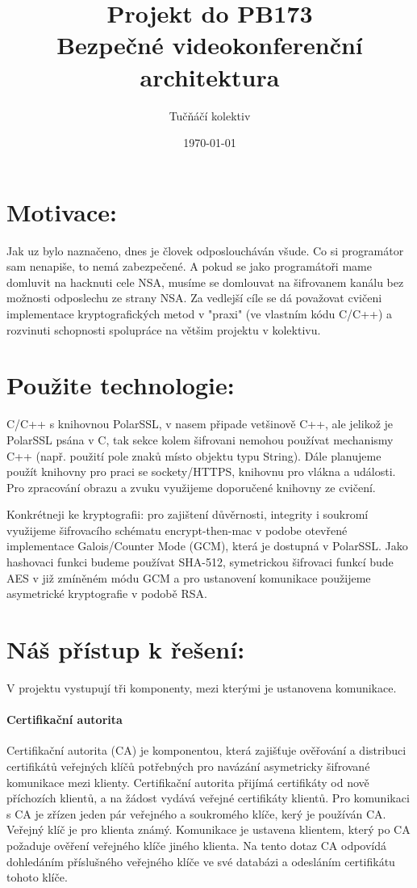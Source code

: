 \documentclass[a4paper, 12pt, titlepage]{article}
\title{Projekt do PB173 \\ Bezpečné videokonferenční architektura}
\author{Tučňáčí kolektiv}
\date{\today}
\begin{document}
\maketitle
\newpage
\tableofcontents
\newpage

\section{Motivace:}

Jak uz bylo naznačeno, dnes je človek odposloucháván všude. Co si programátor 
sam nenapiše, to nemá zabezpečené. A pokud se jako programátoři mame domluvit na 
hacknuti cele NSA,
musíme se domlouvat na šifrovanem kanálu bez možnosti odposlechu ze strany NSA.
Za vedlejší cíle se dá považovat cvičeni implementace kryptografických metod v 
"praxi" (ve vlastním kódu C/C++) a rozvinuti schopnosti spolupráce na většim 
projektu v kolektivu.

\section{Použite technologie:}
C/C++ s knihovnou PolarSSL, v nasem připade vetšinově C++, ale jelikož je 
PolarSSL psána v C, tak sekce kolem šifrovani nemohou používat mechanismy C++ 
(např. použití pole znaků místo objektu typu String).
Dále planujeme použít knihovny pro praci se sockety/HTTPS, knihovnu pro vlákna a 
události. Pro zpracování obrazu a zvuku využijeme doporučené knihovny ze 
cvičení.

Konkrétneji ke kryptografii: pro zajištení důvěrnosti, integrity i soukromí 
využijeme šifrovacího schématu encrypt-then-mac v podobe otevřené implementace 
Galois/Counter Mode (GCM),
která je dostupná v PolarSSL. Jako hashovaci funkci budeme používat SHA-512, 
symetrickou šifrovaci funkcí bude AES v již zmíněném módu GCM a pro ustanovení 
komunikace použijeme asymetrické
kryptografie v podobě RSA.

\section{Náš přístup k řešení:}

V projektu vystupují tři komponenty, mezi kterými je ustanovena komunikace.

\paragraph{Certifikační autorita}
Certifikační autorita (CA) je komponentou, která zajišťuje ověřování a 
distribuci certifikátů veřejných klíčů
potřebných pro navázání asymetricky šifrované komunikace mezi klienty. 
Certifikační autorita přijímá certifikáty od nově příchozích klientů, a na 
žádost vydává veřejné certifikáty klientů. Pro komunikaci s CA je zřízen jeden 
pár veřejného a  soukromého klíče, kerý je používán CA. Veřejný klíč je pro 
klienta známý. Komunikace je ustavena klientem, který po CA požaduje ověření 
veřejného klíče jiného klienta. Na tento dotaz CA odpovídá dohledáním 
příslušného veřejného klíče ve své databázi a odesláním certifikátu tohoto 
klíče.
\end{document}
